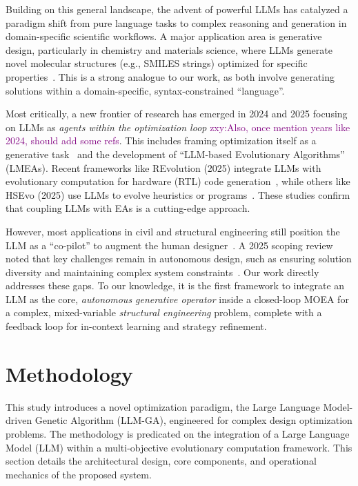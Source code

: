 \documentclass[preprint,12pt]{elsarticle}
\newcommand{\zxy}[1]{\textcolor{purple}{zxy:#1}}
\begin{document}
Building on this general landscape, the advent of powerful LLMs has catalyzed a paradigm shift from pure language tasks to complex reasoning and generation in domain-specific scientific workflows. A major application area is generative design, particularly in chemistry and materials science, where LLMs generate novel molecular structures (e.g., SMILES strings) optimized for specific properties~\citep{wu2024prompt}. This is a strong analogue to our work, as both involve generating solutions within a domain-specific, syntax-constrained ``language''.

Most critically, a new frontier of research has emerged in 2024 and 2025 focusing on LLMs as \textit{agents within the optimization loop} \zxy{Also, once mention years like 2024, should add some refs}. This includes framing optimization itself as a generative task~\citep{yang2024large} and the development of ``LLM-based Evolutionary Algorithms'' (LMEAs). Recent frameworks like REvolution (2025) integrate LLMs with evolutionary computation for hardware (RTL) code generation~\citep{min2025revolution}, while others like HSEvo (2025) use LLMs to evolve heuristics or programs~\citep{dat2025hsevo}. These studies confirm that coupling LLMs with EAs is a cutting-edge approach.

However, most applications in civil and structural engineering still position the LLM as a ``co-pilot'' to augment the human designer~\citep{alwashah2025generative,liu2025generative}. A 2025 scoping review noted that key challenges remain in autonomous design, such as ensuring solution diversity and maintaining complex system constraints~\citep{feng2025guiding}. Our work directly addresses these gaps. To our knowledge, it is the first framework to integrate an LLM as the core, \textit{autonomous generative operator} inside a closed-loop MOEA for a complex, mixed-variable \textit{structural engineering} problem, complete with a feedback loop for in-context learning and strategy refinement.

\section{Methodology}

This study introduces a novel optimization paradigm, the Large Language Model-driven Genetic Algorithm (LLM-GA), engineered for complex design optimization problems. The methodology is predicated on the integration of a Large Language Model (LLM) within a multi-objective evolutionary computation framework. This section details the architectural design, core components, and operational mechanics of the proposed system.
\end{document}
